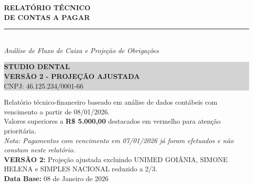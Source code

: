 \documentclass[12pt, a4paper]{article}
\begin{document}
\begin{titlepage}
    \centering
    \vspace*{3cm}
    {\Huge \textbf{\textcolor{primaryColor}{RELATÓRIO TÉCNICO}}} \\
    \vspace{0.5cm}
    {\Huge \textbf{\textcolor{primaryColor}{DE CONTAS A PAGAR}}} \\
    \vspace{2cm}
    \rule{10cm}{1.5pt} \\
    \vspace{0.5cm}
    {\Large \textit{Análise de Fluxo de Caixa e Projeção de Obrigações}} \\
    \vspace{1cm}
    \colorbox{lightGray}{%
        \parbox{0.9\textwidth}{%
            \centering
            \vspace{0.3cm}
            {\Large \textbf{STUDIO DENTAL}} \\
            \vspace{0.2cm}
            {\large \textcolor{accentColor}{\textbf{VERSÃO 2 - PROJEÇÃO AJUSTADA}}} \\
            \vspace{0.3cm}
            {\large CNPJ: 46.125.234/0001-66} \\
            \vspace{0.3cm}
        }%
    }
    \vspace{4cm}

    \vfill
    {\small Relatório técnico-financeiro baseado em análise de dados contábeis com vencimento a partir de 08/01/2026.} \\
    \vspace{0.5cm}
    {\small Valores superiores a \textcolor{accentColor}{\textbf{R\$ 5.000,00}} destacados em vermelho para atenção prioritária.} \\
    \vspace{0.3cm}
    {\small \textit{Nota: Pagamentos com vencimento em 07/01/2026 já foram efetuados e não constam neste relatório.}} \\
    \vspace{0.3cm}
    {\small \textcolor{accentColor}{\textbf{VERSÃO 2:}} Projeção ajustada excluindo UNIMED GOIÂNIA, SIMONE HELENA e SIMPLES NACIONAL reduzido a 2/3.} \\
    \vspace{1cm}
    \textbf{Data Base:} 08 de Janeiro de 2026
\end{titlepage}
\end{document}
